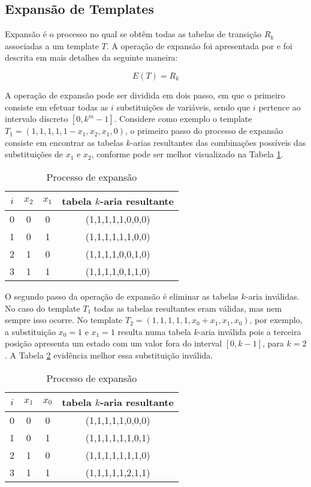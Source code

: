 \newpage\newpage
\subsection{Expansão de Templates}
Expansão é o processo no qual se obtêm todas as tabelas de transição $R_k$ associadas a um template $T$.
A operação de expansão foi apresentada por  e foi descrita em mais detalhes da seguinte maneira:

\begin{equation}
E(T)=R_k
\end{equation}

A operação de expansão pode ser dividida em dois passo, em que o primeiro consiste em efetuar todas as $i$ substituições de variáveis, sendo que $i$ pertence ao intervalo discreto $[0,k^m-1]$. Considere como exemplo o template $T_1 = (1,1,1,1,1-x_1,x_2,x_1,0)$, o primeiro passo do processo de expansão consiste em encontrar as tabelas $k$-arias resultantes das combinações possíveis das substituições de $x_1$ e $x_2$, conforme pode ser melhor visualizado na Tabela \ref{tab:expansionProcess}.

\begin{table}[h!]
\centering
\caption{Processo de expansão}
{
	\vspace{0.3cm}
	\begin{tabular}{cccc}
	\hline
	$i$ & $x_2$ & $x_1$ & tabela $k$-aria resultante \\
	\hline
	0	&	0	&	0	&	(1,1,1,1,1,0,0,0)	\\
	1	&	0	&	1	&	(1,1,1,1,1,1,0,0)	\\
	2	&	1	&	0	&	(1,1,1,1,0,0,1,0)	\\
	3	&	1	&	1	&	(1,1,1,1,0,1,1,0)	\\
	\hline
	\end{tabular}
}
\label{tab:expansionProcess}
\end{table}

O segundo passo da operação de expansão é eliminar as tabelas $k$-aria inválidas. No caso do template $T_1$ todas as tabelas resultantes eram válidas, mas nem sempre isso ocorre. No template $T_2 = (1,1,1,1,1,x_0+x_1,x_1,x_0)$, por exemplo, a substituição $x_0 = 1$ e $x_1 = 1$ resulta numa tabela $k$-aria inválida pois a terceira posição apresenta um estado com um valor fora do interval $[0,k-1]$, para $k=2$. A Tabela \ref{tab:invalideExpansion} evidência melhor essa substituição inválida.

\begin{table}[h!]
\centering
\caption{Processo de expansão}
{
	\vspace{0.3cm}
	\begin{tabular}{cccc}
	\hline
	$i$ & $x_1$ & $x_0$ & tabela $k$-aria resultante \\
	\hline
	0	&	0	&	0	&	(1,1,1,1,1,0,0,0)	\\
	1	&	0	&	1	&	(1,1,1,1,1,1,0,1)	\\
	2	&	1	&	0	&	(1,1,1,1,1,1,1,0)	\\
	3	&	1	&	1	&	(1,1,1,1,1,2,1,1)	\\
	\hline
	\end{tabular}
}
\label{tab:invalideExpansion}
\end{table}

